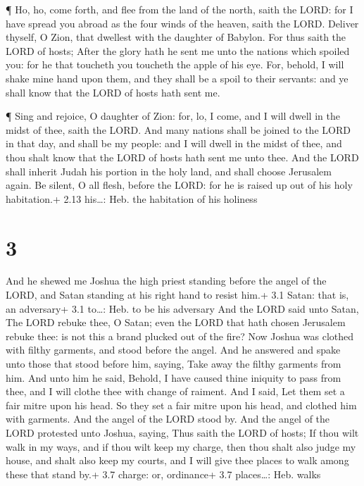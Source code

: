  ¶ Ho, ho, come forth, and flee from the land of the north,
saith the LORD: for I have spread you abroad as the four winds of the
heaven, saith the LORD.  Deliver thyself, O Zion, that
dwellest with the daughter of Babylon.  For thus saith the
LORD of hosts; After the glory hath he sent me unto the nations which
spoiled you: for he that toucheth you toucheth the apple of his eye.
 For, behold, I will shake mine hand upon them, and they
shall be a spoil to their servants: and ye shall know that the LORD of
hosts hath sent me.

 ¶ Sing and rejoice, O daughter of Zion: for, lo, I come,
and I will dwell in the midst of thee, saith the LORD.  And
many nations shall be joined to the LORD in that day, and shall be my
people: and I will dwell in the midst of thee, and thou shalt know that
the LORD of hosts hath sent me unto thee.  And the LORD
shall inherit Judah his portion in the holy land, and shall choose
Jerusalem again.  Be silent, O all flesh, before the LORD:
for he is raised up out of his holy habitation.+ 2.13 his\ldots: Heb.
the habitation of his holiness

\hypertarget{section-2}{%
\section{3}\label{section-2}}

 And he shewed me Joshua the high priest standing before the
angel of the LORD, and Satan standing at his right hand to resist him.+
3.1 Satan: that is, an adversary+ 3.1 to\ldots: Heb. to be his adversary
 And the LORD said unto Satan, The LORD rebuke thee, O
Satan; even the LORD that hath chosen Jerusalem rebuke thee: is not this
a brand plucked out of the fire?  Now Joshua was clothed
with filthy garments, and stood before the angel.  And he
answered and spake unto those that stood before him, saying, Take away
the filthy garments from him. And unto him he said, Behold, I have
caused thine iniquity to pass from thee, and I will clothe thee with
change of raiment.  And I said, Let them set a fair mitre
upon his head. So they set a fair mitre upon his head, and clothed him
with garments. And the angel of the LORD stood by.  And the
angel of the LORD protested unto Joshua, saying,  Thus saith
the LORD of hosts; If thou wilt walk in my ways, and if thou wilt keep
my charge, then thou shalt also judge my house, and shalt also keep my
courts, and I will give thee places to walk among these that stand by.+
3.7 charge: or, ordinance+ 3.7 places\ldots: Heb. walks

